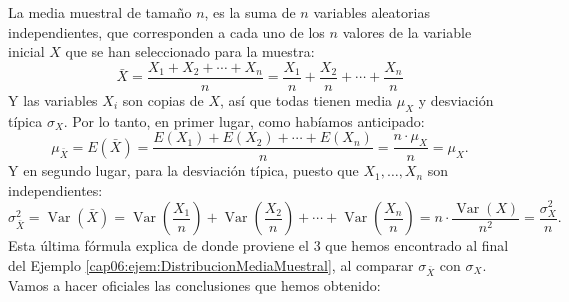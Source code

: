 La media muestral de tamaño $n$, es la suma de $n$ variables aleatorias {\sf
independientes}, que corresponden a cada uno de los $n$ valores de la variable
inicial $X$ que se han seleccionado para la muestra:
    \[\bar X=\dfrac{X_1+X_2+\cdots+X_n}{n}=\dfrac{X_1}{n}+\dfrac{X_2}{n}+\cdots+\dfrac{X_n}{n}\]
Y las variables $X_i$ son copias de $X$, así que todas tienen media $\mu_X$ y
desviación típica $\sigma_X$. Por lo tanto, en primer lugar, como habíamos
anticipado:
    \begin{equation}\label{cap06:ecu:EsperanzaMediaMuestral}
    \mu_{\bar X}=E(\bar X)=\dfrac{E(X_1)+E(X_2)+\cdots+E(X_n)}{n}=\dfrac{n\cdot \mu_X}{n}=\mu_X.
    \end{equation}
Y en segundo lugar, para la desviación típica, {\sf puesto que $X_1,\ldots,X_n$
son independientes}:
    \[\sigma^2_{\bar X}=\operatorname{Var}(\bar X)=\operatorname{Var}\left(\dfrac{X_1}{n}\right)+\operatorname{Var}\left(\dfrac{X_2}{n}\right)+\cdots+\operatorname{Var}\left(\dfrac{X_n}{n}\right)=
    n\cdot\dfrac{\operatorname{Var}(X)}{n^2}=\dfrac{\sigma^2_X}{n}.\]
Esta última fórmula explica de donde proviene el $3$ que hemos encontrado al
final del Ejemplo \ref{cap06:ejem:DistribucionMediaMuestral}, al comparar
$\sigma_{\bar X}$ con $\sigma_X$. Vamos a hacer oficiales las conclusiones que
hemos obtenido:

